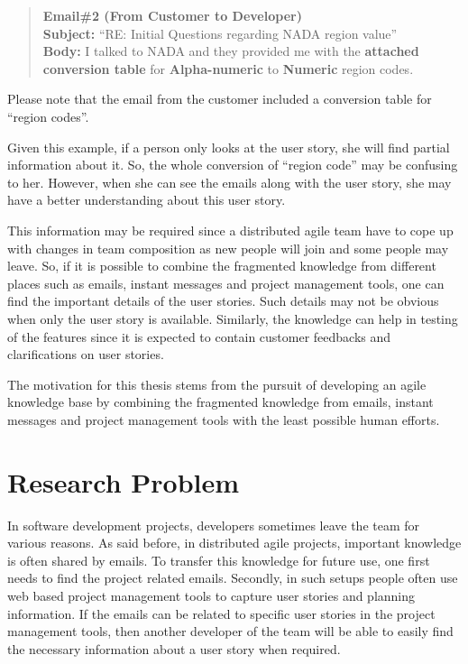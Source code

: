 \begin{quote}
\textbf{Email\#2 (From Customer to Developer)}\\
\textbf{Subject:} ``RE: Initial Questions regarding NADA region value''\\
\textbf{Body:} I talked to NADA and they provided me with the \textbf{attached conversion table} for \textbf{Alpha-numeric} to \textbf{Numeric} region codes.
\end{quote}

Please note that the email from the customer included a conversion table for ``region codes''. 

Given this example, if a person only looks at the user story, she will find partial information about it. So, the whole conversion of ``region code''  may be confusing to her. However, when she can see the emails along with the user story, she may have a better understanding about this user story.

This information may be required since a distributed agile team have to cope up with changes in team composition as new people will join and some people may leave. So, if it is possible to combine the fragmented knowledge from different places such as emails, instant messages and project management tools, one can find the important details of the user stories. Such details may not be obvious when only the user story is available. Similarly, the knowledge can help in testing of the features since it is expected to contain customer feedbacks and clarifications on user stories.

The motivation for this thesis stems from the pursuit of developing an agile knowledge base by combining the fragmented knowledge from emails, instant messages and project management tools with the least possible human efforts.

\section{Research Problem}
In software development projects, developers sometimes leave the team for various reasons. As said before, in distributed agile projects, important knowledge is often shared by emails. To transfer this knowledge for future use, one first needs to find the project related emails. Secondly, in such setups people often use web based project management tools to capture user stories and planning information. If the emails can be related to specific user stories in the project management tools, then another developer of the team will be able to easily find the necessary information about a user story when required.

